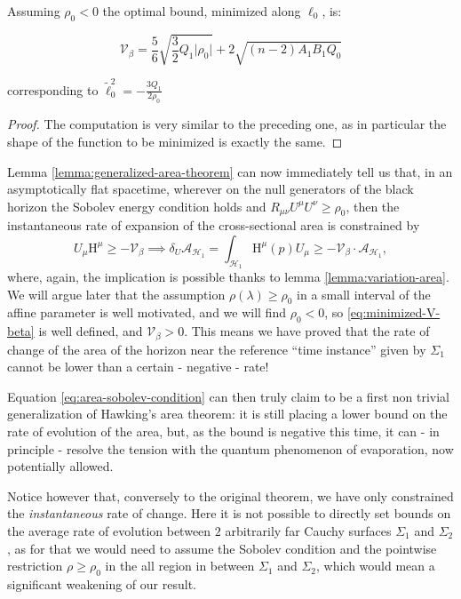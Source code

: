 \begin{prop}
	Assuming \(\rho_0 < 0\) the optimal bound, minimized along \(\ell_0\), is:

	\begin{equation}
		\label{eq:minimized-V-beta}
		\mathcal{V}_{\beta} = \frac{5}{6}\sqrt{\frac{3}{2}Q_1 \vert\rho_0\vert} + 2 \sqrt{(n - 2)A_1B_1Q_0}
	\end{equation}

	corresponding to \(\tilde{\ell}_0^2 = - \frac{3Q_1}{2\rho_0}\)
\end{prop}
\begin{proof}
	The computation is very similar to the preceding one, as in particular the shape of the function to be minimized is exactly the same.
\end{proof}

Lemma \ref{lemma:generalized-area-theorem} can now immediately tell us that, in an asymptotically flat spacetime, wherever on the null generators of the black horizon the Sobolev energy condition holds and \(R_{\mu\nu}U^{\mu}U^{\nu} \ge \rho_0\), then the instantaneous rate of expansion of the cross-sectional area is constrained by
\begin{equation}
	\label{eq:area-sobolev-condition}
	U_{\mu}\mathrm{H}^{\mu} \ge - \mathcal{V}_{\beta} \implies \delta_U\mathcal{A}_{\mathscr{H}_1} = \int_{\mathscr{H}_1} \mathrm{H}^{\mu}(p)U_{\mu} \ge - \mathcal{V}_{\beta}\cdot\mathcal{A}_{\mathscr{H}_1},
\end{equation}
where, again, the implication is possible thanks to lemma \ref{lemma:variation-area}. We will argue later that the assumption \(\rho(\lambda) \ge \rho_0\) in a small interval of the affine parameter is well motivated, and we will find \(\rho_0 < 0\), so \eqref{eq:minimized-V-beta} is well defined, and \(\mathcal{V}_{\beta} >0\). This means we have proved that the rate of change of the area of the horizon near the reference ``time instance'' given by \(\Sigma_1\) cannot be lower than a certain - negative - rate!

Equation \eqref{eq:area-sobolev-condition} can then truly claim to be a first non trivial generalization of Hawking's area theorem: it is still placing a lower bound on the rate of evolution of the area, but, as the bound is negative this time, it can - in principle - resolve the tension with the quantum phenomenon of evaporation, now potentially allowed.
	
Notice however that, conversely to the original theorem, we have only constrained the \emph{instantaneous} rate of change. Here it is not possible to directly set bounds on the average rate of evolution between \(2\) arbitrarily far Cauchy surfaces \(\Sigma_1\) and \(\Sigma_2\), as for that we would need to assume the Sobolev condition and the pointwise restriction \(\rho \ge \rho_0\) in the all region in between \(\Sigma_1\) and \(\Sigma_2\), which would mean a significant weakening of our result.

